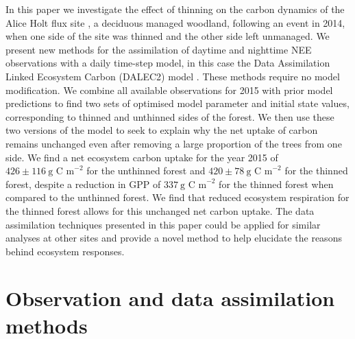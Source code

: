 \documentclass[draft,linenumbers]{agujournal}
\begin{document}
In this paper we investigate the effect of thinning on the carbon dynamics of the Alice Holt flux site \citep{wilkinson2012inter}, a deciduous managed woodland, following an event in 2014, when one side of the site was thinned and the other side left unmanaged. 
We present new methods for the assimilation of daytime and nighttime NEE observations with a daily time-step model, in this case the Data Assimilation Linked Ecosystem Carbon (DALEC2) model \citep{Bloom2015}. These methods require no model modification. We combine all available observations for 2015 with prior model predictions to find two sets of optimised model parameter and initial state values, corresponding to thinned and unthinned sides of the forest. We then use these two versions of the model to seek to explain why the net uptake of carbon remains unchanged even after removing a large proportion of the trees from one side. We find a net ecosystem carbon uptake for the year 2015 of \(426 \pm 116~\text{g C m}^{-2}\) for the unthinned forest and \(420 \pm 78~\text{g C m}^{-2}\) for the thinned forest, despite a reduction in GPP of \(337~\text{g C m}^{-2}\) for the thinned forest when compared to the unthinned forest. We find that reduced ecosystem respiration for the thinned forest allows for this unchanged net carbon uptake. The data assimilation techniques presented in this paper could be applied for similar analyses at other sites and provide a novel method to help elucidate the reasons behind ecosystem responses.      

\section{Observation and data assimilation methods}
\end{document}
